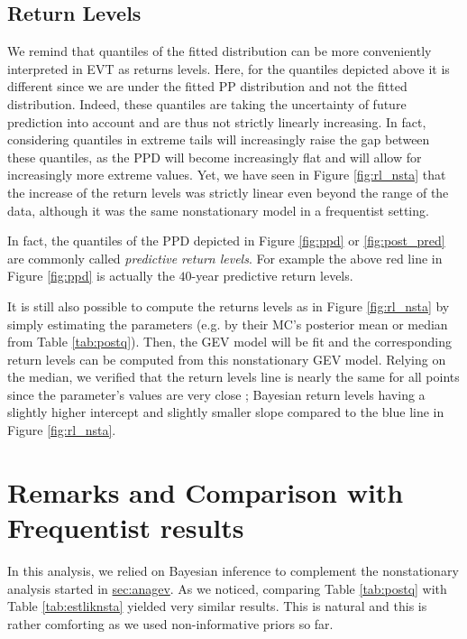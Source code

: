 \subsection{Return Levels}


We remind that quantiles of the fitted distribution can be more conveniently interpreted in EVT as returns levels. 
 Here, for the quantiles depicted above it is different since we are under the fitted PP distribution and not the fitted distribution. Indeed, these quantiles are taking the uncertainty of future prediction into account and are thus not strictly linearly increasing. In fact, considering quantiles in extreme tails will increasingly raise the gap between these quantiles, as the PPD will become increasingly flat and will allow for increasingly more extreme values. Yet, we have seen in Figure \ref{fig:rl_nsta} that the increase of the return levels was strictly linear even beyond the range of the data, although it was the same nonstationary model in a frequentist setting.
 
In fact, the quantiles of the PPD depicted in Figure \ref{fig:ppd} or \ref{fig:post_pred} are commonly called \emph{predictive return levels}. For example the above red line in Figure \ref{fig:ppd} is actually the $40$-year predictive return levels.

It is still also possible to compute the returns levels as in Figure \ref{fig:rl_nsta} by simply estimating the parameters (e.g. by their MC's posterior mean or median from Table \ref{tab:postq}). Then, the GEV model will be fit and the corresponding return levels can be computed from this nonstationary GEV model. Relying on the median, we verified that the return levels line is nearly the same for all points since the parameter's values are very close ; Bayesian return levels having a slightly higher intercept and slightly smaller slope compared to the blue line in Figure \ref{fig:rl_nsta}. 


\section{Remarks and Comparison with Frequentist results}\label{sec:rem}


In this analysis, we relied on Bayesian inference to complement the nonstationary analysis started in \hyperref[sec:anagev]{sec:anagev}. 
As we noticed, comparing Table \ref{tab:postq} with Table \ref{tab:estliknsta} yielded very similar results. This is natural and this is rather comforting as we used non-informative priors so far.

